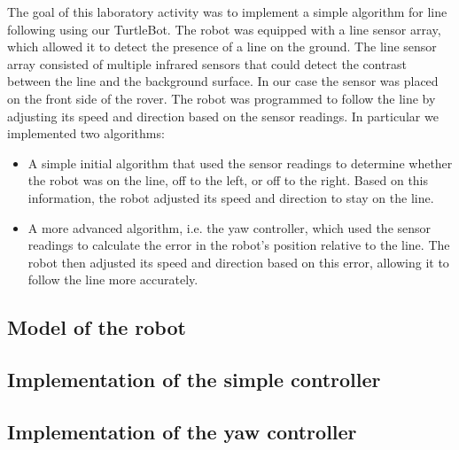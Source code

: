 The goal of this laboratory activity was to implement a simple algorithm for line following using our TurtleBot. The robot was equipped with a line sensor array, which allowed it to detect the presence of a line on the ground.
The line sensor array consisted of multiple infrared sensors that could detect the contrast between the line and the background surface. In our case the sensor was placed on the front side of the rover. 
The robot was programmed to follow the line by adjusting its speed and direction based on the sensor readings. 
In particular we implemented two algorithms: 
\begin{itemize}
    \item A simple initial algorithm that used the sensor readings to determine whether the robot was on the line, off to the left, or off to the right. Based on this information, the robot adjusted its speed and direction to stay on the line.
    \item A more advanced algorithm, i.e. the yaw controller, which used the sensor readings to calculate the error in the robot's position relative to the line. The robot then adjusted its speed and direction based on this error, allowing it to follow the line more accurately.
\end{itemize}

\subsection{Model of the robot}


\subsection{Implementation of the simple controller}


\subsection{Implementation of the yaw controller}
